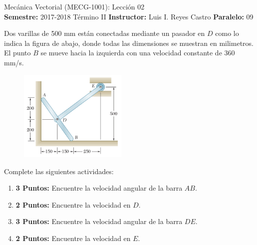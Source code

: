\documentclass[ a4paper, twoside, 11pt]{article}
\newcommand{\numero}{02}
\begin{document}
\allowdisplaybreaks

\begin{center}
\Large Mec\'anica Vectorial (MECG-1001): Lecci\'on \numero \\[2ex]
\small \textbf{Semestre:} 2017-2018 T\'ermino II \qquad
\textbf{Instructor:} Luis I. Reyes Castro \qquad
\textbf{Paralelo:} 09
\end{center}
\fullskip

\begin{problem} Dos varillas de 500 mm est\'an conectadas mediante un pasador en $D$ como lo indica la figura de abajo, donde todas las dimensiones se muestran en milimetros. El punto $B$ se mueve hacia la izquierda con una velocidad constante de 360 mm/s. 

\begin{figure}[htb]
\centering
\includegraphics[width=0.46\textwidth]{problema-01.jpg}
\end{figure}

Complete las siguientes actividades: 
\begin{enumerate}[label=\textbf{\alph*)}]
\item \textbf{3 Puntos:} Encuentre la velocidad angular de la barra $AB$. 
\item \textbf{2 Puntos:} Encuentre la velocidad en $D$. 
\item \textbf{3 Puntos:} Encuentre la velocidad angular de la barra $DE$. 
\item \textbf{2 Puntos:} Encuentre la velocidad en $E$. 
\end{enumerate}

\end{problem}
\fullskip
\end{document}
